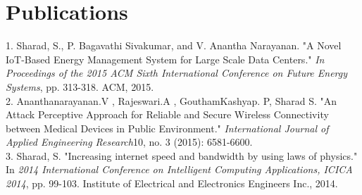\documentclass[]{friggeri-cv} %
\begin{document}

\section{Publications}
1. Sharad, S., P. Bagavathi Sivakumar, and V. Anantha Narayanan. "A Novel IoT-Based Energy Management System for Large Scale Data Centers." \textit{In Proceedings of the 2015 ACM Sixth International Conference on Future Energy Systems}, pp. 313-318. ACM, 2015. \\
2. Ananthanarayanan.V , Rajeswari.A , GouthamKashyap. P, Sharad S. "An Attack Perceptive Approach for Reliable and Secure Wireless Connectivity between Medical Devices in Public Environment." \textit{International Journal of Applied Engineering Research}10, no. 3 (2015): 6581-6600.\\
3. Sharad,  S. "Increasing internet speed and bandwidth by using laws of physics." In  \textit{2014 International Conference on Intelligent Computing Applications, ICICA 2014}, pp. 99-103.  Institute of Electrical and Electronics Engineers Inc., 2014.\\
\end{document}
